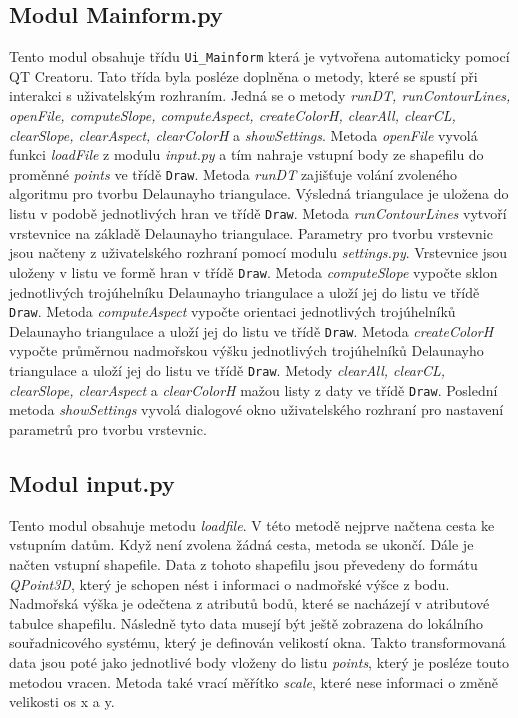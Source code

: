\documentclass{article}
\begin{document}
\subsection{\small{Modul Mainform.py}}
Tento modul obsahuje třídu \texttt{Ui\_Mainform} která je vytvořena automaticky pomocí QT Creatoru. Tato třída byla posléze doplněna o metody, které se spustí při interakci s uživatelským rozhraním. Jedná se o metody \emph{runDT, runContourLines, openFile, computeSlope, computeAspect, createColorH, clearAll, clearCL, clearSlope, clearAspect, clearColorH} a \emph{showSettings}. Metoda \emph{openFile} vyvolá funkci \emph{loadFile} z modulu \emph{input.py} a tím nahraje vstupní body ze shapefilu do proměnné \emph{points} ve třídě \texttt{Draw}. Metoda \emph{runDT} zajišťuje volání zvoleného algoritmu pro tvorbu Delaunayho triangulace. Výsledná triangulace je uložena do listu v podobě jednotlivých hran ve třídě \texttt{Draw}. Metoda \emph{runContourLines} vytvoří vrstevnice na základě Delaunayho triangulace. Parametry pro tvorbu vrstevnic jsou načteny z uživatelského rozhraní pomocí modulu \emph{settings.py}. Vrstevnice jsou uloženy v listu ve formě hran v třídě \texttt{Draw}. Metoda \emph{computeSlope} vypočte sklon jednotlivých trojúhelníku Delaunayho triangulace a uloží jej do listu ve třídě \texttt{Draw}. Metoda \emph{computeAspect} vypočte orientaci jednotlivých trojúhelníků Delaunayho triangulace a uloží jej do listu ve třídě \texttt{Draw}. Metoda \emph{createColorH} vypočte průměrnou nadmořskou výšku jednotlivých trojúhelníků Delaunayho triangulace a uloží jej do listu ve třídě \texttt{Draw}. Metody \emph{clearAll, clearCL, clearSlope, clearAspect} a \emph{clearColorH} mažou listy z daty ve třídě \texttt{Draw}. Poslední metoda \emph{showSettings} vyvolá dialogové okno uživatelského rozhraní pro nastavení parametrů pro tvorbu vrstevnic.
\subsection{\small{Modul input.py}}
Tento modul obsahuje metodu \emph{loadfile}. V této metodě nejprve načtena cesta ke vstupním datům. Když není zvolena žádná cesta, metoda se ukončí. Dále je načten vstupní shapefile. Data z tohoto shapefilu jsou převedeny do formátu \emph{QPoint3D}, který je schopen nést i informaci o nadmořské výšce z bodu. Nadmořská výška je odečtena z atributů bodů, které se nacházejí v atributové tabulce shapefilu. Následně tyto data musejí být ještě zobrazena do lokálního souřadnicového systému, který je definován velikostí okna. Takto transformovaná data jsou poté jako jednotlivé body vloženy do listu \emph{points}, který je posléze touto metodou vracen. Metoda také vrací měřítko \emph{scale}, které nese informaci o změně velikosti os x a y.
\end{document}
